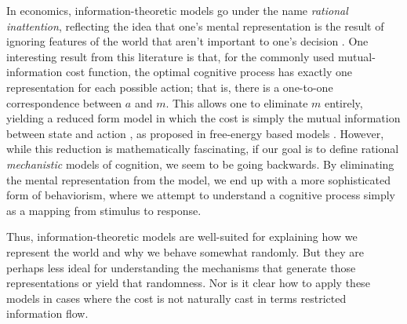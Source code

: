 In economics, information-theoretic models go under the name \emph{rational inattention}, reflecting the idea that one's mental representation is the result of ignoring features of the world that aren't important to one's decision \citep{sims1998stickiness,caplin2013behavioral}. 
One interesting result from this literature is that, for the commonly used mutual-information cost function, the optimal cognitive process has exactly one representation for each possible action; that is, there is a one-to-one correspondence between $a$ and $m$. This allows one to eliminate $m$ entirely, yielding a reduced form model in which the cost is simply the mutual information between state and action \citep{matejka2015rational}, as proposed in free-energy based models \citep{friston2010freeenergy,ortega2013thermodynamics}. However, while this reduction is mathematically fascinating, if our goal is to define rational \emph{mechanistic} models of cognition, we seem to be going backwards. By eliminating the mental representation from the model, we end up with a more sophisticated form of behaviorism, where we attempt to understand a cognitive process simply as a mapping from stimulus to response.


Thus, information-theoretic models are well-suited for explaining how we represent the world and why we behave somewhat randomly. But they are perhaps less ideal for understanding the mechanisms that generate those representations or yield that randomness. Nor is it clear how to apply these models in cases where the cost is not naturally cast in terms restricted information flow.

